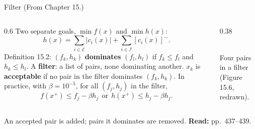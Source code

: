 \documentclass[aspectratio=169,12pt]{beamer}
\newcommand{\readbook}[1]{{\color{red}\textbf{Read:} #1}}
\newcommand{\cE}{\mathcal{E}}
\newcommand{\cI}{\mathcal{I}}
\newcommand{\from}[1]{{\small(From #1.)}}
\begin{document}
\begin{frame}{Filter \from{Chapter 15}}
  \begin{columns}[T,totalwidth=\textwidth]
    \begin{column}{0.6\textwidth}
      Two separate goals, $\min f(x)$ and $\min h(x)$:
      \[ h(x)=\sum_{i\in\cE}|c_{i}(x)|+\sum_{i\in\cI}[c_{i}(x)]^{-} . \tag{15.31} \]
      Definition 15.2: $(f_{k},h_{k})$ \textbf{dominates} $(f_{l},h_{l})$ if $f_{k}\le f_{l}$ and $h_{k}\le h_{l}$.
      A \textbf{filter}: a list of pairs, none dominating another. $x_{k}$ is \textbf{acceptable} if no pair in
      the filter dominates $(f_{k},h_{k})$. In practice, with $\beta=10^{-5}$, for all $(f_{j},h_{j})$ in the filter,
      \[ f(x^{+})\le f_{j}-\beta h_{j}\ \ \text{or}\ \ h(x^{+})\le h_{j}-\beta h_{j}. \tag{15.33} \]
    \end{column}
    \begin{column}{0.38\textwidth}
      \centering
      \\[0.2em]
      {\small Four pairs in a filter (Figure 15.6, redrawn).}
    \end{column}
  \end{columns}
  An accepted pair is added; pairs it dominates are removed. \readbook{pp.~437--439.}
\end{frame}
\end{document}
